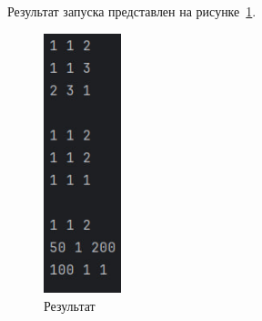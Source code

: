 \documentclass[a4paper, 14pt]{extarticle}
\begin{document}
	Результат запуска представлен на рисунке~\ref{fig:img1}.
	
	\begin{figure}[!htb]
		\centering
		\includegraphics[width=0.2\textwidth]{img1}
		\caption{Результат}
		\label{fig:img1}
	\end{figure}
	
\end{document}
